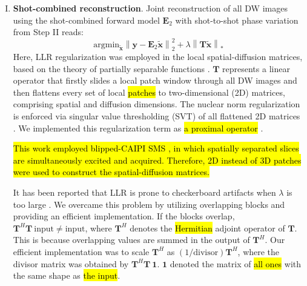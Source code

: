 \documentclass[preprint,12pt,authoryear,review]{elsarticle}
\begin{document}
\begin{enumerate}[I.]
        \item \textbf{Shot-combined reconstruction}.
        Joint reconstruction of all DW images using
        the shot-combined forward model $\mathbf{E}_2$
        with shot-to-shot phase variation from Step II reads:
        \begin{equation}
            \mathrm{argmin}_\mathbf{\tilde{x}} \left\| \mathbf{y} - \mathbf{E}_2 \mathbf{\tilde{x}} \right\|_2^2
            + \lambda \left\| \mathbf{T} \mathbf{\tilde{x}} \right\|_*
            \label{EQU:solve_dwi}
        \end{equation}
    	Here, LLR regularization was employed in the local spatial-diffusion matrices,
    	based on the theory of partially separable functions
    	\citep{liang_2007_psf,trzasko_2011_lr,zhang_2015_llr}.
    	$\mathbf{T}$ represents a linear operator that firstly slides a local patch window
    	through all DW images and then
    	flattens every set of local \hl{patches} 
    	to two-dimensional (2D) matrices,
        comprising spatial and diffusion dimensions.
    	The nuclear norm regularization is enforced via
    	singular value thresholding (SVT) of all flattened 2D matrices
        \citep{cai_2010_svt}.
    	We implemented this regularization term as \hl{a proximal operator}
    	\citep{beck_2017_optim}. 

        \hl{This work employed blipped-CAIPI SMS
        \mbox{\citep{setsompop_2012_blipped}},
        in which spatially separated slices are simultaneously
        excited and acquired.
        Therefore, 2D instead of 3D patches were used to
        construct the spatial-diffusion matrices.}

    	It has been reported that LLR
        is prone to checkerboard artifacts
    	when $\lambda$ is too large \citep{hu_2020_spa_llr}.
    	We overcame this problem by utilizing overlapping blocks and
    	providing an efficient implementation.
    	If the blocks overlap, $\mathbf{T}^H \mathbf{T}~\mathrm{input} \neq \mathrm{input}$,
    	where $\mathbf{T}^H$ denotes the \hl{Hermitian} adjoint operator of $\mathbf{T}$.
    	This is because overlapping values are summed in the output of $\mathbf{T}^H$.
    	Our efficient implementation was to scale $\mathbf{T}^H$
    	as $(1 / \mathrm{divisor})\mathbf{T}^H$,
    	where the divisor matrix was obtained by $\mathbf{T}^H \mathbf{T}~\mathbf{1}$.
    	$\mathbf{1}$ denoted the matrix of \hl{all ones}
    	with the same shape as \hl{the input}.

    \end{enumerate}
\end{document}
